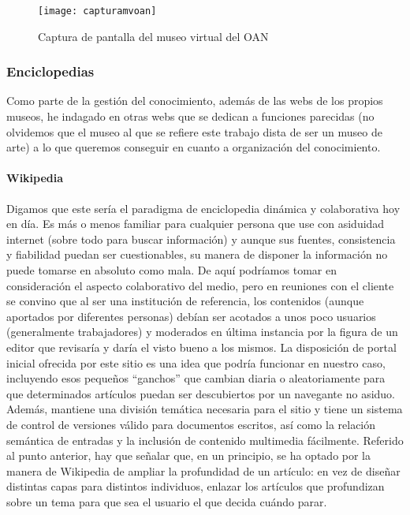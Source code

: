 \begin{figure}
\begin{narrow}{-0.1\linewidth}{-0.1\linewidth}
\centering
\texttt{[image: capturamvoan]}
\caption{Captura de pantalla del museo virtual del OAN}
\end{narrow}
\label{fig:oan}
\end{figure}

\subsubsection{Enciclopedias}

\par Como parte de la gestión del conocimiento, además de las webs de los propios museos, he indagado en otras webs que se dedican a funciones parecidas (no olvidemos que el museo al que se refiere este trabajo dista de ser un museo de arte) a lo que queremos conseguir en cuanto a organización del conocimiento.

\paragraph{Wikipedia}
\par Digamos que este sería el paradigma de enciclopedia dinámica y colaborativa hoy en día. Es más o menos familiar para cualquier persona que use con asiduidad internet (sobre todo para buscar información) y aunque sus fuentes, consistencia y fiabilidad puedan ser cuestionables, su manera de disponer la información no puede tomarse en absoluto como mala. De aquí podríamos tomar en consideración el aspecto colaborativo del medio, pero en reuniones con el cliente se convino que al ser una institución de referencia, los contenidos (aunque aportados por diferentes personas) debían ser acotados a unos poco usuarios (generalmente trabajadores) y moderados en última instancia por la figura de un editor que revisaría y daría el visto bueno a los mismos.
La disposición de portal inicial ofrecida por este sitio es una idea que podría funcionar en nuestro caso, incluyendo esos pequeños ``ganchos'' que cambian diaria o aleatoriamente para que determinados artículos puedan ser descubiertos por un navegante no asiduo. Además, mantiene una división temática necesaria para el sitio y tiene un sistema de control de versiones válido para documentos escritos, así como la relación semántica de entradas y la inclusión de contenido multimedia fácilmente.
Referido al punto anterior, hay que señalar que, en un principio, se ha optado por la manera de Wikipedia de ampliar la profundidad de un artículo: en vez de diseñar distintas capas para distintos individuos, enlazar los artículos que profundizan sobre un tema para que sea el usuario el que decida cuándo parar.


